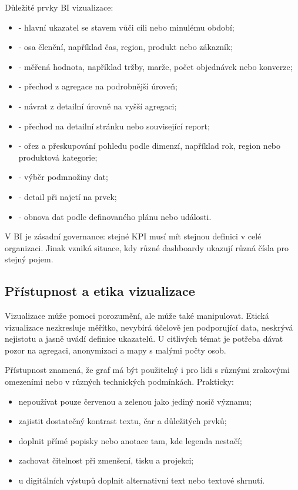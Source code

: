 Důležité prvky BI vizualizace:
\begin{itemize}
  \item {} - hlavní ukazatel se stavem vůči cíli nebo minulému období;
  \item {} - osa členění, například čas, region, produkt nebo zákazník;
  \item {} - měřená hodnota, například tržby, marže, počet objednávek nebo konverze;
  \item {} - přechod z agregace na podrobnější úroveň;
  \item {} - návrat z detailní úrovně na vyšší agregaci;
  \item {} - přechod na detailní stránku nebo související report;
  \item {} - ořez a přeskupování pohledu podle dimenzí, například rok, region
  nebo produktová kategorie;
  \item {} - výběr podmnožiny dat;
  \item {} - detail při najetí na prvek;
  \item {} - obnova dat podle definovaného plánu nebo události.
\end{itemize}

V BI je zásadní governance: stejné KPI musí mít stejnou definici v celé organizaci. Jinak vzniká
situace, kdy různé dashboardy ukazují různá čísla pro stejný pojem.

\subsection{Přístupnost a etika vizualizace}
Vizualizace může pomoci porozumění, ale může také manipulovat. Etická vizualizace nezkresluje měřítko,
nevybírá účelově jen podporující data, neskrývá nejistotu a jasně uvádí definice ukazatelů. U citlivých
témat je potřeba dávat pozor na agregaci, anonymizaci a mapy s malými počty osob.

Přístupnost znamená, že graf má být použitelný i pro lidi s různými zrakovými omezeními nebo v různých
technických podmínkách. Prakticky:
\begin{itemize}
  \item nepoužívat pouze červenou a zelenou jako jediný nosič významu;
  \item zajistit dostatečný kontrast textu, čar a důležitých prvků;
  \item doplnit přímé popisky nebo anotace tam, kde legenda nestačí;
  \item zachovat čitelnost při zmenšení, tisku a projekci;
  \item u digitálních výstupů doplnit alternativní text nebo textové shrnutí.
\end{itemize}

